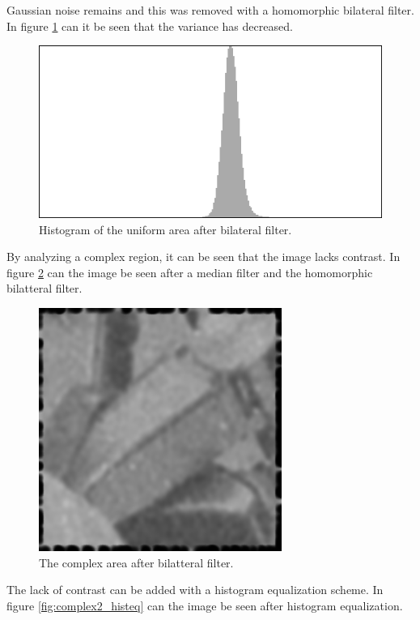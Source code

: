 Gaussian noise remains and this was removed with a homomorphic bilateral filter.
In figure \ref{fig:hist2_bilateral} can it be seen that the variance has decreased.

\begin{figure}[H]
\centering
\includegraphics[width = 0.8 \linewidth]{graphics/hist2_after_bilatteral.png}
\caption{Histogram of the uniform area after bilateral filter.}
\label{fig:hist2_bilateral}
\end{figure}

By analyzing a complex region, it can be seen that the image lacks contrast.
In figure \ref{fig:complex2_bilatteral} can the image be seen after a median filter and the homomorphic bilatteral filter.

\begin{figure}[H]
\centering
\includegraphics[width = 0.5 \linewidth]{graphics/complex2_bilatteral.png}
\caption{The complex area after bilatteral filter.}
\label{fig:complex2_bilatteral}
\end{figure}

The lack of contrast can be added with a histogram equalization scheme.
In figure \ref{fig:complex2_histeq} can the image be seen after histogram equalization.


